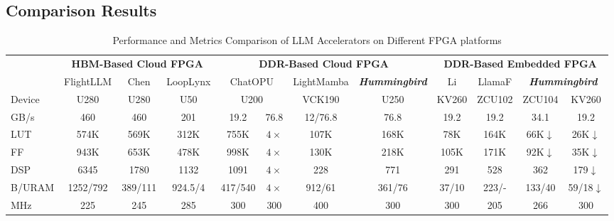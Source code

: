 \documentclass[conference]{IEEEtran}
\begin{document}
\subsection{Comparison Results}

\begin{table}[t]
  \centering
  \setlength{\tabcolsep}{5pt}
  \caption{Performance and Metrics Comparison of LLM Accelerators on Different FPGA platforms}
  \begin{tabular}{lccccccccccc}
  \toprule
  \multicolumn{1}{c}{} & \multicolumn{3}{c}{\textbf{HBM-Based Cloud FPGA}} & \multicolumn{4}{c}{\textbf{DDR-Based Cloud FPGA}} & \multicolumn{4}{c}{\textbf{DDR-Based Embedded FPGA}} \\
  \cmidrule(lr){2-4} \cmidrule(lr){5-8} \cmidrule(lr){9-12}
  & FlightLLM & Chen\cite{chen2024understanding} & LoopLynx & \multicolumn{2}{c}{ChatOPU} & LightMamba & \textbf{\textit{Hummingbird}} & Li\cite{li2025pushing} & LlamaF & \multicolumn{2}{c}{\textbf{\textit{Hummingbird}}} \\
  \midrule
  {Device}      & U280      & U280       & U50       & \multicolumn{2}{c}{U200}     & VCK190     & U250        & KV260    & ZCU102    & ZCU104     & KV260             \\
  {GB/s}        & 460       & 460        & 201       & 19.2   & 76.8                & 12/76.8    & 76.8        & 19.2     & 19.2      & 34.1       & 19.2              \\
  \midrule
  {LUT}         & 574K      & 569K       & 312K      & 755K   & $4\times$           & 107K       & 168K        & 78K      & 164K      & 66K$\downarrow$        & 26K$\downarrow$               \\
  {FF}          & 943K      & 653K       & 478K      & 998K   & $4\times$           & 130K       & 218K        & 105K     & 171K      & 92K$\downarrow$        & 35K$\downarrow$               \\
  {DSP}         & 6345      & 1780       & 1132      & 1091   & $4\times$           & 228        & 771         & 291      & 528       & 362        & 179$\downarrow$               \\
  {B/URAM}      & 1252/792  & 389/111    & 924.5/4   & 417/540& $4\times$           & 912/61     & 361/76      & 37/10    & 223/-     & 133/40     & 59/18$\downarrow$             \\
  {MHz}         & 225       & 245        & 285       & 300    & 300                 & 400        & 300         & 300      & 205       & 266        & 300               \\

\end{tabular}
\end{table}
\end{document}
